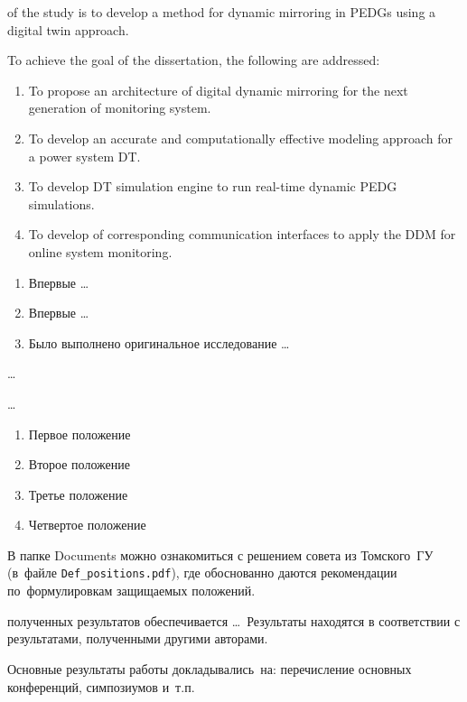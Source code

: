 {\aim} of the study is to develop a method for dynamic mirroring in PEDGs using a digital twin approach. 

To achieve the goal of the dissertation, the following {\tasks} are addressed:
\begin{enumerate}[beginpenalty=10000] %
  \item To propose an architecture of digital dynamic mirroring for the next generation of monitoring system.
  \item To develop an accurate and computationally effective modeling approach for a power system DT.
  \item To develop DT simulation engine to run real-time dynamic PEDG simulations.
  \item To develop of corresponding communication interfaces to apply the DDM for online system monitoring.
\end{enumerate}


{\novelty}
\begin{enumerate}[beginpenalty=10000] %
  \item Впервые \ldots
  \item Впервые \ldots
  \item Было выполнено оригинальное исследование \ldots
\end{enumerate}

{\influence} \ldots

{\methods} \ldots

{}
\begin{enumerate}[beginpenalty=10000] %
  \item Первое положение
  \item Второе положение
  \item Третье положение
  \item Четвертое положение
\end{enumerate}
В папке Documents можно ознакомиться с решением совета из Томского~ГУ
(в~файле \verb+Def_positions.pdf+), где обоснованно даются рекомендации
по~формулировкам защищаемых положений.

{\reliability} полученных результатов обеспечивается \ldots \ Результаты находятся в соответствии с результатами, полученными другими авторами.


{\probation}
Основные результаты работы докладывались~на:
перечисление основных конференций, симпозиумов и~т.\:п.

